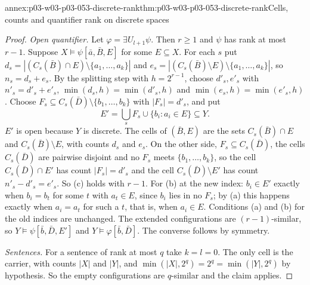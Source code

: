 \begin{annexitem}{annex:p03-w03-p03-053-discrete-rank}{thm:p03-w03-p03-053-discrete-rank}{Cells, counts and quantifier rank on discrete spaces}
\begin{proof}
\emph{Open quantifier.} Let \(\varphi=\exists U_{l+1}\psi\). Then \(r\ge1\)
and \(\psi\) has rank at most \(r-1\). Suppose
\(X\models\psi[\bar a,\bar B,E]\) for some \(E\subseteq X\). For each
\(s\) put \(d_s=|(C_s(\bar B)\cap E)\setminus\{a_1,\ldots,a_k\}|\) and
\(e_s=|(C_s(\bar B)\setminus E)\setminus\{a_1,\ldots,a_k\}|\), so
\(n_s=d_s+e_s\). By the splitting step with \(h=2^{r-1}\), choose
\(d'_s,e'_s\) with \(n'_s=d'_s+e'_s\), \(\min(d_s,h)=\min(d'_s,h)\) and
\(\min(e_s,h)=\min(e'_s,h)\). Choose
\(F_s\subseteq C_s(\bar D)\setminus\{b_1,\ldots,b_k\}\) with
\(|F_s|=d'_s\), and put
\[
 E'=\bigcup_s F_s\cup\{b_i: a_i\in E\}\subseteq Y .
\]
\(E'\) is open because \(Y\) is discrete. The cells of
\((\bar B,E)\) are the sets \(C_s(\bar B)\cap E\) and
\(C_s(\bar B)\setminus E\), with counts \(d_s\) and \(e_s\). On the other
side, \(F_s\subseteq C_s(\bar D)\), the cells \(C_s(\bar D)\) are pairwise
disjoint and no \(F_s\) meets \(\{b_1,\ldots,b_k\}\), so the cell
\(C_s(\bar D)\cap E'\) has count \(|F_s|=d'_s\) and the cell
\(C_s(\bar D)\setminus E'\) has count \(n'_s-d'_s=e'_s\). So (c) holds
with \(r-1\). For (b) at the new index: \(b_i\in E'\) exactly when
\(b_i=b_t\) for some \(t\) with \(a_t\in E\), since \(b_i\) lies in no
\(F_s\); by (a) this happens exactly when \(a_i=a_t\) for such a \(t\),
that is, when \(a_i\in E\). Conditions (a) and (b) for the old indices are
unchanged. The extended configurations are \((r-1)\)-similar, so
\(Y\models\psi[\bar b,\bar D,E']\) and \(Y\models\varphi[\bar b,\bar D]\).
The converse follows by symmetry.

\emph{Sentences.} For a sentence of rank at most \(q\) take \(k=l=0\).
The only cell is the carrier, with counts \(|X|\) and \(|Y|\), and
\(\min(|X|,2^q)=2^q=\min(|Y|,2^q)\) by hypothesis. So the empty
configurations are \(q\)-similar and the claim applies.
\end{proof}
\end{annexitem}

